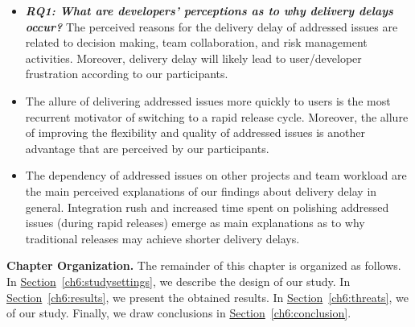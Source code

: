 \begin{itemize}

	\item \textbf{\textit{RQ1: What are developers' perceptions as to why
		delivery delays occur?}} The perceived reasons for
		the delivery delay of addressed issues are related to 
		decision making, team collaboration, and risk
		management activities. Moreover, delivery delay will likely lead to
		user/developer frustration according to our participants.\\

	\item \textbf{\DIFdelbegin \textit{}%
\DIFdelend \DIFaddbegin \textit{}\DIFaddend } The allure of delivering
		addressed issues more quickly to users is the most recurrent
		motivator of switching to a rapid release cycle. Moreover, the
		allure of improving the flexibility and quality of addressed
		issues is another advantage that are perceived by our
		participants.\\

	\item \textbf{\DIFdelbegin \textit{}%
\DIFdelend \DIFaddbegin \textit{}\DIFaddend } The dependency of addressed
		issues on other projects and team workload are the main
		perceived explanations of our findings about delivery delay in
		general. Integration rush and increased time spent on polishing
		addressed issues (during rapid releases) emerge as main
		explanations as to why traditional releases may achieve shorter
		delivery delays. 
\end{itemize}  

\noindent \textbf{Chapter Organization.} The remainder of this chapter is
organized as follows. In
\hyperref[ch6:studysettings]{Section}~\ref{ch6:studysettings}, we describe the
design of our study. In \hyperref[ch6:results]{Section}~\ref{ch6:results}, we
present the obtained results. In
\hyperref[ch6:threats]{Section}~\ref{ch6:threats}, we \DIFdelbegin {}\DIFdelend \DIFaddbegin {}\DIFaddend of our study. Finally, we draw conclusions in
\hyperref[ch6:conclusion]{Section}~\ref{ch6:conclusion}. 

